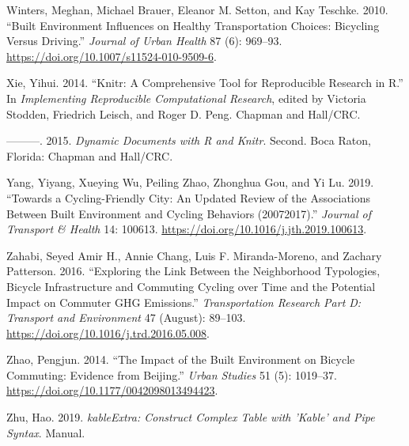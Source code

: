 \documentclass[smallextended]{svjour3}       %
\begin{document}
\leavevmode\hypertarget{ref-Winters2010}{}%
Winters, Meghan, Michael Brauer, Eleanor M. Setton, and Kay Teschke.
2010. ``Built Environment Influences on Healthy Transportation Choices:
Bicycling Versus Driving.'' \emph{Journal of Urban Health} 87 (6):
969--93. \url{https://doi.org/10.1007/s11524-010-9509-6}.

\leavevmode\hypertarget{ref-Xie2014}{}%
Xie, Yihui. 2014. ``Knitr: A Comprehensive Tool for Reproducible
Research in R.'' In \emph{Implementing Reproducible Computational
Research}, edited by Victoria Stodden, Friedrich Leisch, and Roger D.
Peng. Chapman and Hall/CRC.

\leavevmode\hypertarget{ref-Xie2015}{}%
---------. 2015. \emph{Dynamic Documents with R and Knitr}. Second. Boca
Raton, Florida: Chapman and Hall/CRC.

\leavevmode\hypertarget{ref-yangCyclingfriendlyCityUpdated2019}{}%
Yang, Yiyang, Xueying Wu, Peiling Zhao, Zhonghua Gou, and Yi Lu. 2019.
``Towards a Cycling-Friendly City: An Updated Review of the Associations
Between Built Environment and Cycling Behaviors (20072017).''
\emph{Journal of Transport \& Health} 14: 100613.
\url{https://doi.org/10.1016/j.jth.2019.100613}.

\leavevmode\hypertarget{ref-Zahabi2016}{}%
Zahabi, Seyed Amir H., Annie Chang, Luis F. Miranda-Moreno, and Zachary
Patterson. 2016. ``Exploring the Link Between the Neighborhood
Typologies, Bicycle Infrastructure and Commuting Cycling over Time and
the Potential Impact on Commuter GHG Emissions.'' \emph{Transportation
Research Part D: Transport and Environment} 47 (August): 89--103.
\url{https://doi.org/10.1016/j.trd.2016.05.008}.

\leavevmode\hypertarget{ref-Zhao2014}{}%
Zhao, Pengjun. 2014. ``The Impact of the Built Environment on Bicycle
Commuting: Evidence from Beijing.'' \emph{Urban Studies} 51 (5):
1019--37. \url{https://doi.org/10.1177/0042098013494423}.

\leavevmode\hypertarget{ref-Zhu2019}{}%
Zhu, Hao. 2019. \emph{kableExtra: Construct Complex Table with 'Kable'
and Pipe Syntax}. Manual.




\end{document}
